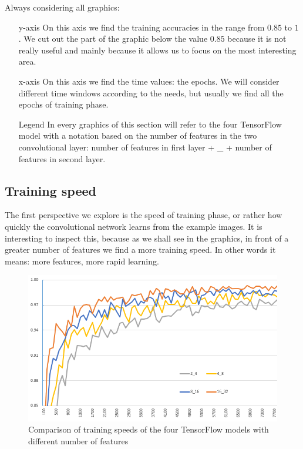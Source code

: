 Always considering all graphics:
\begin{itemize}
	\item[y-axis] On this axis we find the training accuracies in the range from $0.85$ to $1$. We cut out the part of the graphic below the value $0.85$ because it is not really useful and mainly because it allows us to focus on the most interesting area.
	\item[x-axis] On this axis we find the time values: the epochs. We will consider different time windows according to the needs, but usually we find all the epochs of training phase.
	\item[Legend] In every graphics of this section will refer to the four TensorFlow model with a notation based on the number of features in the two convolutional layer: number of features in first layer + \_ + number of features in second layer.
\end{itemize}

\subsection{Training speed}

The first perspective we explore is the speed of training phase, or rather how quickly the convolutional network learns from the example images. It is interesting to inspect this, because as we shall see in the graphics, in front of a greater number of features we find a more training speed. In other words it means: more features, more rapid learning.

\begin{figure}
	\caption{Comparison of training speeds of the four TensorFlow models with different number of features}
	\label{fig:training_speed}
	\centering
	\includegraphics[width=1\textwidth]{Images/training_speed}
\end{figure}

